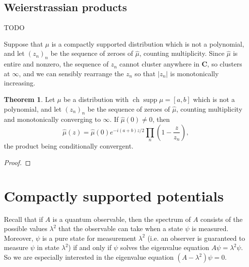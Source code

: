 \documentclass[12pt]{report}
\newcommand{\CC}{\mathbf{C}}
\DeclareMathOperator{\ch}{ch}
\DeclareMathOperator{\supp}{supp}
\theoremstyle{definition}
\newtheorem{theorem}{Theorem}[chapter]
\begin{document}
\section{Weierstrassian products}
TODO

Suppose that $\mu$ is a compactly supported distribution which is not a polynomial, and let $(z_n)_n$ be the sequence of zeroes of $\hat \mu$, counting multiplicity. Since $\hat \mu$ is entire and nonzero, the sequence of $z_n$ cannot cluster anywhere in $\CC$, so clusters at $\infty$, and we can sensibly rearrange the $z_n$ so that $|z_n|$ is monotonically increasing.
\begin{theorem}
Let $\mu$ be a distribution with $\ch \supp \mu = [a, b]$ which is not a polynomial, and let $(z_n)_n$ be the sequence of zeroes of $\hat \mu$, counting multiplicity and monotonically converging to $\infty$. If $\hat \mu(0) \neq 0$, then
$$\hat \mu(z) = \hat \mu(0) e^{-i(a+b)z/2}\prod_n \left(1 - \frac{z}{z_n}\right),$$
the product being conditionally convergent.
\end{theorem}
\begin{proof}

\end{proof}


\chapter{Compactly supported potentials}


Recall that if $A$ is a quantum observable, then the spectrum of $A$ consists of the possible values $\lambda^2$ that the observable can take when a state $\psi$ is measured. Moreover, $\psi$ is a pure state for measurement $\lambda^2$ (i.e. an observer is guaranteed to measure $\psi$ in state $\lambda^2$) if and only if $\psi$ solves the eigenvalue equation $A\psi = \lambda^2 \psi$. So we are especially interested in the eigenvalue equation $(A - \lambda^2)\psi = 0$.
\end{document}
